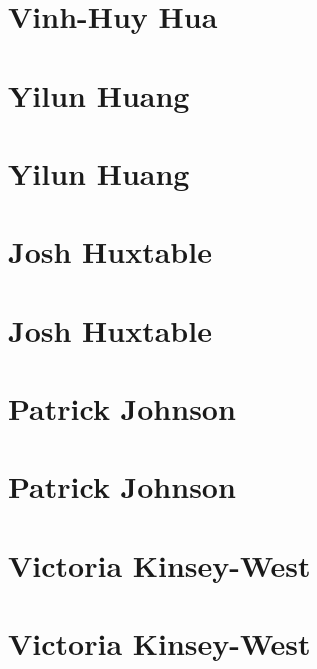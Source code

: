 \documentclass[twoside,14pt,a4paper,notitlepage]{memoir}
\begin{document}
\lipsum[1-2]
\section*{Vinh-Huy Hua}
\lipsum[3]



\section*{Yilun Huang}
\label{aut:huang}

\lipsum[1-2]
\section*{Yilun Huang}
\lipsum[3]



\section*{Josh Huxtable}
\label{aut:huxtable}

\lipsum[1-2]
\section*{Josh Huxtable}
\lipsum[3]



\section*{Patrick Johnson}
\label{aut:johnson}

\lipsum[1-2]
\section*{Patrick Johnson}
\lipsum[3]



\section*{Victoria Kinsey-West}
\label{aut:west}

\lipsum[1-2]
\section*{Victoria Kinsey-West}
\lipsum[3]
\end{document}
